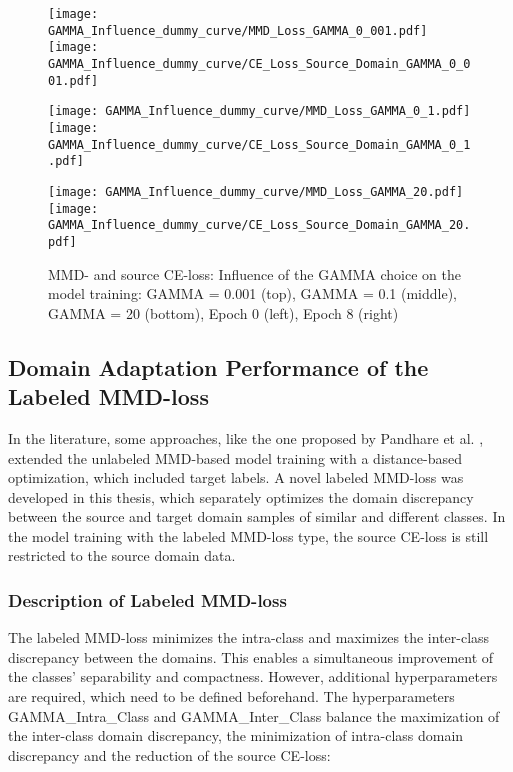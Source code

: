 \begin{figure}[H]
  \centering
  \texttt{[image: GAMMA\_Influence\_dummy\_curve/MMD\_Loss\_GAMMA\_0\_001.pdf]}
  \hspace{.3cm}
  \texttt{[image: GAMMA\_Influence\_dummy\_curve/CE\_Loss\_Source\_Domain\_GAMMA\_0\_001.pdf]}

  \vspace{.1cm}

  \texttt{[image: GAMMA\_Influence\_dummy\_curve/MMD\_Loss\_GAMMA\_0\_1.pdf]}
  \hspace{.3cm}
  \texttt{[image: GAMMA\_Influence\_dummy\_curve/CE\_Loss\_Source\_Domain\_GAMMA\_0\_1.pdf]}

  \vspace{.1cm}

  \texttt{[image: GAMMA\_Influence\_dummy\_curve/MMD\_Loss\_GAMMA\_20.pdf]}
  \hspace{.1cm}
  \texttt{[image: GAMMA\_Influence\_dummy\_curve/CE\_Loss\_Source\_Domain\_GAMMA\_20.pdf]}

  \caption{MMD- and source CE-loss: Influence of the GAMMA choice on the model training: GAMMA = 0.001 (top), GAMMA = 0.1 (middle), GAMMA = 20 (bottom), Epoch 0 (left), Epoch 8 (right)}
  \label{fig:learning_curves_influence_mmd_feature_extractor}
\end{figure}

\subsection{Domain Adaptation Performance of the Labeled MMD-loss} \label{sec:Differences of labeled and unlabeled MMD loss}

In the literature, some approaches, like the one proposed by Pandhare et al. \cite{Pandhare2021}, extended the unlabeled MMD-based model training with a distance-based optimization, which included target labels. A novel labeled MMD-loss was developed in this thesis, which separately optimizes the domain discrepancy between the source and target domain samples of similar and different classes. In the model training with the labeled MMD-loss type, the source CE-loss is still restricted to the source domain data.
\subsubsection{Description of Labeled MMD-loss}
The labeled MMD-loss minimizes the intra-class and maximizes the inter-class discrepancy between the domains. This enables a simultaneous improvement of the classes' separability and compactness. However, additional hyperparameters are required, which need to be defined beforehand. The hyperparameters GAMMA\_Intra\_Class and GAMMA\_Inter\_Class balance the maximization of the inter-class domain discrepancy, the minimization of intra-class domain discrepancy and the reduction of the source CE-loss:

